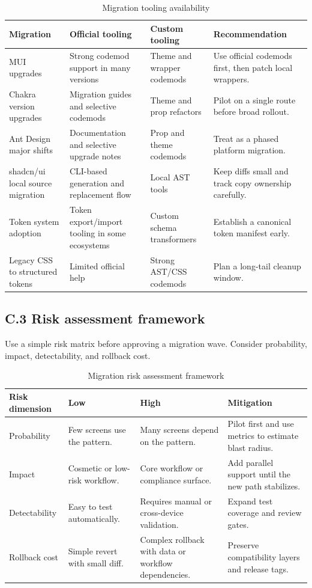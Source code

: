 \begin{table}[htbp]
  \centering
  \caption{Migration tooling availability}
  \begin{tabularx}{\textwidth}{@{}p{}p{}p{}Y@{}}
    \toprule
    \textbf{Migration} & \textbf{Official tooling} & \textbf{Custom tooling} & \textbf{Recommendation} \\
    \midrule
    MUI upgrades & Strong codemod support in many versions & Theme and wrapper codemods & Use official codemods first, then patch local wrappers. \\
    Chakra version upgrades & Migration guides and selective codemods & Theme and prop refactors & Pilot on a single route before broad rollout. \\
    Ant Design major shifts & Documentation and selective upgrade notes & Prop and theme codemods & Treat as a phased platform migration. \\
    shadcn/ui local source migration & CLI-based generation and replacement flow & Local AST tools & Keep diffs small and track copy ownership carefully. \\
    Token system adoption & Token export/import tooling in some ecosystems & Custom schema transformers & Establish a canonical token manifest early. \\
    Legacy CSS to structured tokens & Limited official help & Strong AST/CSS codemods & Plan a long-tail cleanup window. \\
    \bottomrule
  \end{tabularx}
\end{table}

\subsection*{C.3 Risk assessment framework}
Use a simple risk matrix before approving a migration wave. Consider probability, impact, detectability, and rollback cost.

\begin{table}[htbp]
  \centering
  \caption{Migration risk assessment framework}
  \begin{tabularx}{\textwidth}{@{}p{}p{}p{}Y@{}}
    \toprule
    \textbf{Risk dimension} & \textbf{Low} & \textbf{High} & \textbf{Mitigation} \\
    \midrule
    Probability & Few screens use the pattern. & Many screens depend on the pattern. & Pilot first and use metrics to estimate blast radius. \\
    Impact & Cosmetic or low-risk workflow. & Core workflow or compliance surface. & Add parallel support until the new path stabilizes. \\
    Detectability & Easy to test automatically. & Requires manual or cross-device validation. & Expand test coverage and review gates. \\
    Rollback cost & Simple revert with small diff. & Complex rollback with data or workflow dependencies. & Preserve compatibility layers and release tags. \\
    \bottomrule
  \end{tabularx}
\end{table}

